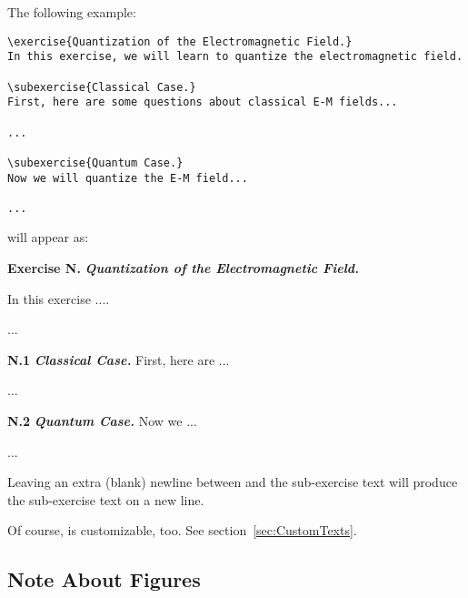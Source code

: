 \documentclass[11pt,a4paper]{article}
\begin{document}



The following example:
\begin{pkgverbatim}
\begin{verbatim}
\exercise{Quantization of the Electromagnetic Field.}
In this exercise, we will learn to quantize the electromagnetic field.

\subexercise{Classical Case.}
First, here are some questions about classical E-M fields...

...

\subexercise{Quantum Case.}
Now we will quantize the E-M field...

...

\end{verbatim}
\end{pkgverbatim}
will appear as:
\begin{pkgverbatim}[0mm]
  {\bf Exercise N.} \hspace*{2mm} {\em\bfseries Quantization of the Electromagnetic Field.}

  In this exercise ....

  ...

  {\bf N.1}\hspace*{1mm} {\em\bfseries Classical Case.}\hspace*{3mm} First, here are ...

  ...

  {\bf N.2}\hspace*{1mm} {\em\bfseries Quantum Case.}\hspace*{3mm} Now we ...

  ...
  
\end{pkgverbatim}

\begin{pkgtip}
  Leaving an extra (blank) newline between  and the sub-exercise text
  will produce the sub-exercise text on a new line.
\end{pkgtip}

\begin{pkgtip}
  Of course,  is customizable, too. See section~\ref{sec:CustomTexts}.
\end{pkgtip}

\subsection{Note About Figures}
\end{document}

